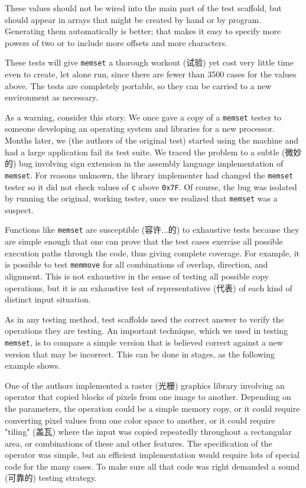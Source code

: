 These values should not be wired into the main part of the test scaffold,
but should appear in arrays that might be created by hand or by program.
Generating them automatically is better; that makes it easy to specify more
powers of two or to include more offsets and more characters.

These tests will give \texttt{memset} a thorough workout (试验) yet cost
very little time even to create, let alone run, since there are fewer than
3500 cases for the values above. The tests are completely portable, so they
can be carried to a new environment as necessary.

As a warning, consider this story. We once gave a copy of a \texttt{memset}
tester to someone developing an operating system and libraries for a new
processor.  Months later, we (the authors of the original test) started
using the machine and had a large application fail its test suite. We
traced the problem to a subtle (微妙的) bug involving sign extension in the
assembly language implementation of \texttt{memset}. For reasons unknown,
the library implementer had changed the \texttt{memset} tester so it did
not check values of \texttt{c} above \texttt{0x7F}. Of course, the bug was
isolated by running the original, working tester, once we realized that
\texttt{memset} was a suspect.

Functions like \texttt{memset} are susceptible (容许...的) to exhaustive
tests because they are simple enough that one can prove that the test cases
exercise all possible execution paths through the code, thus giving
complete coverage. For example, it is possible to test \texttt{memmove} for
all combinations of overlap, direction, and alignment. This is not
exhaustive in the sense of testing all possible copy operations, but it is
an exhaustive test of representatives (代表) of each kind of distinct input
situation.

As in any testing method, test scaffolds need the correct answer to verify
the operations they are testing. An important technique, which we used in
testing \texttt{memset}, is to compare a simple version that is believed
correct against a new version that may be incorrect. This can be done in
stages, as the following example shows.

One of the authors implemented a raster (光栅) graphics library involving
an operator that copied blocks of pixels from one image to another.
Depending on the parameters, the operation could be a simple memory copy,
or it could require converting pixel values from one color space to
another, or it could require "tiling" (盖瓦) where the input was copied
repeatedly throughout a rectangular area, or combinations of these and
other features. The specification of the operator was simple, but an
efficient implementation would require lots of special code for the many
cases. To make sure all that code was right demanded a sound (可靠的)
testing strategy.

